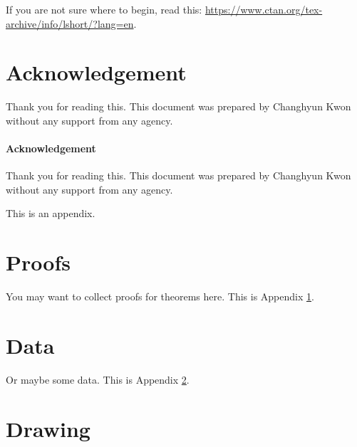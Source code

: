\documentclass[letterpaper, 11pt]{article}
\begin{document}
If you are not sure where to begin, read this: \url{https://www.ctan.org/tex-archive/info/lshort/?lang=en}.


\section*{Acknowledgement}
Thank you for reading this.
This document was prepared by Changhyun Kwon without any support from any agency.


\paragraph{Acknowledgement}
Thank you for reading this.
This document was prepared by Changhyun Kwon without any support from any agency.











\newpage
\renewcommand{\appendixpagename}{Appendix}

\appendix
\appendixpage

This is an appendix.

\section{Proofs} \label{appendix:proofs}

You may want to collect proofs for theorems here.
This is Appendix \ref{appendix:proofs}.

\section{Data} \label{appendix:data}

Or maybe some data. This is Appendix \ref{appendix:data}.

\section{Drawing} \label{appendix:drawing}
\end{document}
